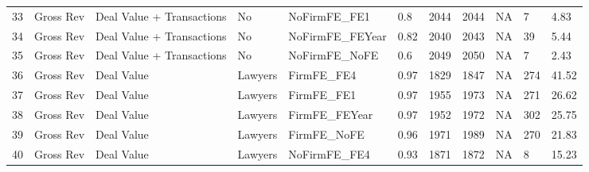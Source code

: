 \begin{table}[ht]
\begin{tabular}{rllllllllll}
  33 & Gross Rev & Deal Value + Transactions & No & NoFirmFE\_FE1 & 0.8 & 2044 & 2044 & NA & 7 & 4.83 \\ 
  34 & Gross Rev & Deal Value + Transactions & No & NoFirmFE\_FEYear & 0.82 & 2040 & 2043 & NA & 39 & 5.44 \\ 
  35 & Gross Rev & Deal Value + Transactions & No & NoFirmFE\_NoFE & 0.6 & 2049 & 2050 & NA & 7 & 2.43 \\ 
  36 & Gross Rev & Deal Value & Lawyers & FirmFE\_FE4 & 0.97 & 1829 & 1847 & NA & 274 & 41.52 \\ 
  37 & Gross Rev & Deal Value & Lawyers & FirmFE\_FE1 & 0.97 & 1955 & 1973 & NA & 271 & 26.62 \\ 
  38 & Gross Rev & Deal Value & Lawyers & FirmFE\_FEYear & 0.97 & 1952 & 1972 & NA & 302 & 25.75 \\ 
  39 & Gross Rev & Deal Value & Lawyers & FirmFE\_NoFE & 0.96 & 1971 & 1989 & NA & 270 & 21.83 \\ 
  40 & Gross Rev & Deal Value & Lawyers & NoFirmFE\_FE4 & 0.93 & 1871 & 1872 & NA & 8 & 15.23 \\ 
   \hline
\end{tabular}
\end{table}
